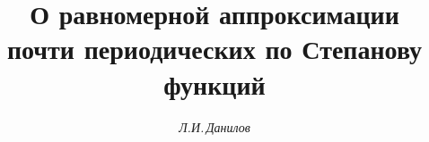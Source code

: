 







\newcommand{\mes}{\operatorname{mes}}


\newcommand{\Mod}{\operatorname{Mod}}


\newcommand{\cl}{\operatorname{cl}}


\newcommand{\dist}{\operatorname{dist}}


\newcommand{\sign}{\operatorname{sign}}


\newcommand{\myfont}{\series{m}\shape{n}\selectfont}


\newcommand{\esssup}{\operatornamewithlimits{ess~sup}}


\newcommand{\tts}[1]{}










\setcounter{page}{10}












\author{\it Л.И.\,Данилов}




\title{О равномерной аппроксимации\\


почти периодических по Степанову функций}





\date{}







\pagestyle{plain} %








